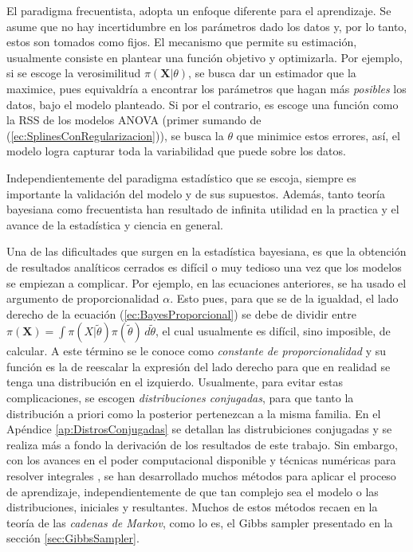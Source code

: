 \documentclass[../Main/Main.tex]{subfiles}
\begin{document}
El paradigma frecuentista, adopta un enfoque diferente para el  aprendizaje. Se asume que no hay incertidumbre en los parámetros dado los datos y, por lo tanto, estos son tomados como fijos. El mecanismo que permite su estimación, usualmente consiste en plantear una función objetivo y optimizarla. Por ejemplo, si se escoge la verosimilitud $\pi(\mathbf{X}|\theta)$, se busca dar un estimador que la maximice, pues equivaldría a encontrar los parámetros que hagan más \textit{posibles} los datos, bajo el modelo planteado. Si por el contrario, es escoge una función como la RSS de los modelos ANOVA (primer sumando de (\ref{ec:SplinesConRegularizacion})), se busca la $\theta$ que minimice estos errores, así, el modelo logra capturar toda la variabilidad que puede sobre los datos. 

Independientemente del paradigma estadístico que se escoja, siempre es importante la validación del modelo y de sus supuestos. Además, tanto teoría bayesiana como frecuentista han resultado de infinita utilidad en la practica y el avance de la estadística y ciencia en general.

Una de las dificultades que surgen en la estadística bayesiana, es que la obtención de resultados analíticos cerrados es difícil o muy tedioso una vez que los modelos se empiezan a complicar. Por ejemplo, en las ecuaciones anteriores, se ha usado el argumento de proporcionalidad $\alpha$. Esto pues, para que se de la igualdad, el lado derecho de la ecuación (\ref{ec:BayesProporcional}) se debe de dividir entre $\pi(\mathbf{X}) = \int \pi(X|\tilde{\theta})\pi(\tilde{\theta})\,d\tilde{\theta}$, el cual usualmente es difícil, sino imposible, de calcular. A este término se le conoce como \textit{constante de proporcionalidad} y su función es la de reescalar la expresión del lado derecho para que en realidad se tenga una distribución en el izquierdo. Usualmente, para evitar estas complicaciones, se escogen \textit{distribuciones conjugadas}, para que tanto la distribución a priori como la posterior pertenezcan a la misma familia. En el Apéndice \ref{ap:DistrosConjugadas} se detallan las distrubiciones conjugadas y se realiza más a fondo la derivación de los resultados de este trabajo. Sin embargo, con los avances en el poder computacional disponible y técnicas numéricas para resolver integrales \autocite{robert2004monte}, se han desarrollado muchos métodos para aplicar el proceso de aprendizaje, independientemente de que tan complejo sea el modelo o las distribuciones, iniciales y resultantes. Muchos de estos métodos recaen en la teoría de las \textit{cadenas de Markov}, como lo es, el Gibbs sampler presentado en la sección \ref{sec:GibbsSampler}. 
\end{document}
